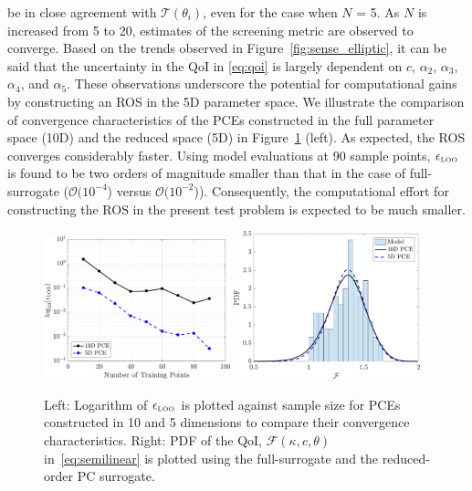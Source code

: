be in close agreement with $\mathcal{T}(\theta_i)$, even for the case when $N$ = 5. As $N$
is increased from 5 to 20, estimates of the screening metric are observed to converge.
Based on the trends observed in Figure~\ref{fig:sense_elliptic}, it can be said that
the uncertainty in the QoI in \eqref{eq:qoi} is largely dependent on $c$, 
$\alpha_2$, $\alpha_3$, $\alpha_4$, and $\alpha_5$. These observations underscore the
potential for computational gains by constructing an ROS in the 5D parameter space. We 
illustrate the comparison of convergence characteristics of the PCEs constructed in the
full parameter space (10D) and the reduced space (5D) in Figure~\ref{fig:conv_elliptic} (left). 
As expected, the ROS converges considerably faster. Using model evaluations at 90
sample points, $\epsilon_{\mbox{\tiny{LOO}}}$ is found to be two orders of magnitude
smaller than that in the case of full-surrogate ($\mathcal{O}(10^{-4}$) versus
$\mathcal{O}(10^{-2}$)). 
Consequently, the computational effort for constructing the ROS in the present test problem
is expected to be much smaller. 
%
\begin{figure}[htbp]
 \begin{center}
  \includegraphics[width=0.48\textwidth]{./Figures/err_samples_elliptic}
  \includegraphics[width=0.48\textwidth]{./Figures/pdf_comp_elliptic}
\caption{Left: Logarithm of $\epsilon_{\mbox{\tiny{LOO}}}$ is plotted against sample size for 
PCEs constructed in 10 and 5 dimensions to compare their convergence characteristics. 
Right: PDF of the QoI, $\mathcal{F}(\kappa, c, \theta)$ in~\eqref{eq:semilinear} is
plotted using the full-surrogate and the reduced-order PC surrogate.}
\label{fig:conv_elliptic}
\end{center}
\end{figure}

